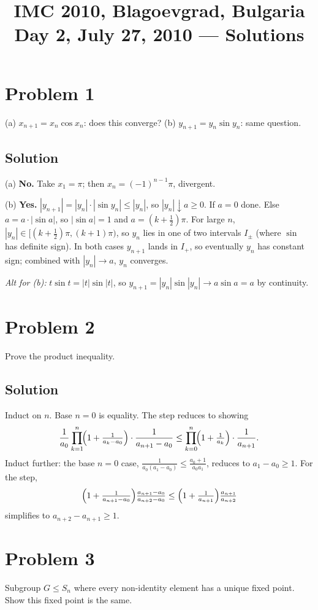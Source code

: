 \documentclass{article}
\title{IMC 2010, Blagoevgrad, Bulgaria \\ Day 2, July 27, 2010 --- Solutions}
\date{}
\begin{document}
\maketitle

\section*{Problem 1}
(a) $x_{n+1} = x_n \cos x_n$: does this converge?
(b) $y_{n+1} = y_n \sin y_n$: same question.

\subsection*{Solution}
(a) \textbf{No.} Take $x_1 = \pi$; then $x_n = (-1)^{n-1}\pi$, divergent.

(b) \textbf{Yes.} $|y_{n+1}| = |y_n| \cdot |\sin y_n| \le |y_n|$, so $|y_n| \downarrow a \ge 0$. If $a = 0$ done. Else $a = a \cdot |\sin a|$, so $|\sin a| = 1$ and $a = (k + \tfrac{1}{2})\pi$. For large $n$, $|y_n| \in [(k + \tfrac12)\pi, (k+1)\pi)$, so $y_n$ lies in one of two intervals $I_\pm$ (where $\sin$ has definite sign). In both cases $y_{n+1}$ lands in $I_+$, so eventually $y_n$ has constant sign; combined with $|y_n| \to a$, $y_n$ converges.

\emph{Alt for (b):} $t \sin t = |t| \sin |t|$, so $y_{n+1} = |y_n| \sin|y_n| \to a \sin a = a$ by continuity.

\section*{Problem 2}
Prove the product inequality.

\subsection*{Solution}
Induct on $n$. Base $n = 0$ is equality. The step reduces to showing
\[
\frac{1}{a_0}\prod_{k=1}^n\!\Bigl(1 + \tfrac{1}{a_k - a_0}\Bigr) \cdot \frac{1}{a_{n+1} - a_0} \le \prod_{k=0}^n\!\Bigl(1 + \tfrac{1}{a_k}\Bigr) \cdot \frac{1}{a_{n+1}}.
\]
Induct further: the base $n = 0$ case, $\tfrac{1}{a_0(a_1 - a_0)} \le \tfrac{a_0 + 1}{a_0 a_1}$, reduces to $a_1 - a_0 \ge 1$. For the step,
\[
\Bigl(1 + \tfrac{1}{a_{n+1} - a_0}\Bigr) \tfrac{a_{n+1} - a_0}{a_{n+2} - a_0} \le \Bigl(1 + \tfrac{1}{a_{n+1}}\Bigr) \tfrac{a_{n+1}}{a_{n+2}}
\]
simplifies to $a_{n+2} - a_{n+1} \ge 1$.

\section*{Problem 3}
Subgroup $G \le S_n$ where every non-identity element has a unique fixed point. Show this fixed point is the same.
\end{document}
